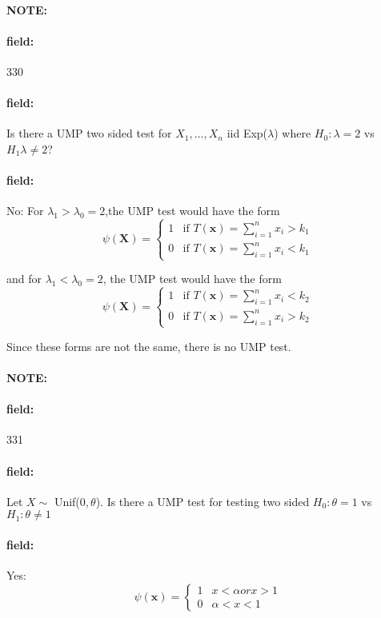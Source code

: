 \documentclass[12pt]{article}
\newenvironment{note}{\paragraph{NOTE:}}{}
\newenvironment{field}{\paragraph{field:}}{}
\begin{document}
\begin{note}
    \begin{field}
        \tiny 330
    \end{field}
    \begin{field}
        Is there a UMP two sided test for $X_1, \ldots , X_n$ iid Exp($\lambda$) where $H_0: \lambda = 2 $ vs $H_1 \lambda \neq 2$?
    \end{field}
    \begin{field}
        No:
        For $\lambda_1 > \lambda_0 = 2$,the UMP test would have the form
        \[
          \psi(\mathbf{X}) =
          \begin{cases}
              1 &  \text{if } T(\mathbf{x}) = \sum_{i=1}^n x_i > k_1\\
              0  & \text{if } T(\mathbf{x}) = \sum_{i=1}^n x_i <k_1
          \end{cases}
        \]

        and for $\lambda_1 < \lambda_0 = 2$, the UMP test would have the form
        \[
          \psi(\mathbf{X}) =
          \begin{cases}
              1 &  \text{if } T(\mathbf{x}) = \sum_{i=1}^n x_i < k_2\\
              0  & \text{if } T(\mathbf{x}) = \sum_{i=1}^n x_i > k_2
          \end{cases}
        \]


        Since these forms are not the same, there is no UMP test.
    \end{field}
\end{note}


\begin{note}
    \begin{field}
        \tiny 331
    \end{field}
    \begin{field}
        Let $X\sim$ Unif($0,\theta$). Is there a UMP test for testing two sided $H_0: \theta = 1$ vs $H_1: \theta \neq 1$
    \end{field}
    \begin{field}
        Yes:  \[
          \psi(\mathbf{x}) =
          \begin{cases}
               1 & x < \alpha or x > 1 \\
               0 & \alpha < x < 1
          \end{cases}
        \]

    \end{field}
\end{note}
\end{document}
